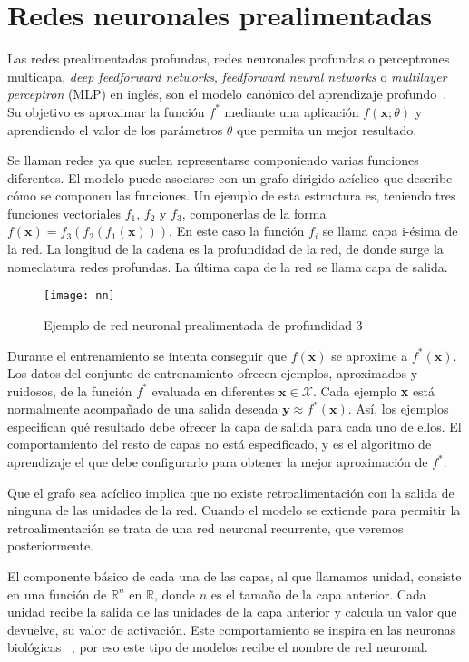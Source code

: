 \section{Redes neuronales prealimentadas}

Las redes prealimentadas profundas, redes neuronales profundas o perceptrones multicapa, \textit{deep feedforward networks}, \textit{feedforward neural networks} o \textit{multilayer perceptron} (MLP) en inglés, son el modelo canónico del aprendizaje profundo~\cite{abu2012learning}. Su objetivo es aproximar la función $f^*$ mediante una aplicación $f(\textbf{x};\theta)$ y aprendiendo el valor de los parámetros $\theta$ que permita un mejor resultado.

Se llaman redes ya que suelen representarse componiendo varias funciones diferentes. El modelo puede asociarse con un grafo dirigido acíclico que describe cómo se componen las funciones. Un ejemplo de esta estructura es, teniendo tres funciones vectoriales $f_1$, $f_2$ y $f_3$, componerlas de la forma $f(\textbf{x}) = f_3(f_2(f_1(\textbf{x})))$. En este caso la función $f_i$ se llama capa i-ésima de la red. La longitud de la cadena es la profundidad de la red, de donde surge la nomeclatura redes profundas. La última capa de la red se llama capa de salida.

\begin{figure}[htpb]
  \centering
  \texttt{[image: nn]}
  \caption{Ejemplo de red neuronal prealimentada de profundidad 3}
  \label{fig:nn}
\end{figure}


Durante el entrenamiento se intenta conseguir que $f(\textbf{x})$ se aproxime a $f^*(\textbf{x})$. Los datos del conjunto de entrenamiento ofrecen ejemplos, aproximados y ruidosos, de la función $f^*$ evaluada en diferentes $\textbf{x} \in \mathcal{X}$. Cada ejemplo \textbf{x} está normalmente acompañado de una salida deseada $\textbf{y} \approx f^*(\textbf{x})$. Así, los ejemplos especifican qué resultado debe ofrecer la capa de salida para cada uno de ellos. El comportamiento del resto de capas no está especificado, y es el algoritmo de aprendizaje el que debe configurarlo para obtener la mejor aproximación de $f^*$.

Que el grafo sea acíclico implica que no existe retroalimentación con la salida de ninguna de las unidades de la red. Cuando el modelo se extiende para permitir la retroalimentación se trata de una red neuronal recurrente, que veremos posteriormente.

El componente básico de cada una de las capas, al que llamamos unidad, consiste en una función de $\mathbb{R}^n$ en $\mathbb{R}$, donde $n$ es el tamaño de la capa anterior. Cada unidad recibe la salida de las unidades de la capa anterior y calcula un valor que devuelve, su valor de activación. Este comportamiento se inspira en las neuronas biológicas ~\cite{izenman2008modern}, por eso este tipo de modelos recibe el nombre de red neuronal.

